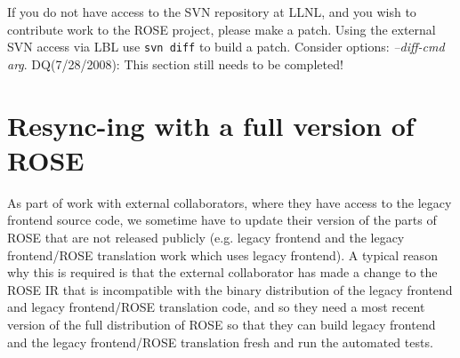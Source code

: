 \begin{enumerate}

    \end{enumerate}

  If you do not have access to the SVN repository at LLNL, and you wish to contribute
    work to the ROSE project, please make a patch.  Using the external SVN access via
    LBL use {\tt svn diff} to build a patch.
    Consider options: {\em --diff-cmd arg}.
    DQ(7/28/2008): This section still needs to be completed!




\section{Resync-ing with a full version of ROSE}%
   As part of work with external collaborators, where they have 
access to the legacy frontend source code, we sometime have to update their
version of the parts of ROSE that are not released publicly
(e.g. legacy frontend and the legacy frontend/ROSE translation work which uses legacy frontend).
A typical reason why this is required is that the external
collaborator has made a change to the ROSE IR that is incompatible
with the binary distribution of the legacy frontend and legacy frontend/ROSE translation code,
and so they need a most recent version of the full distribution of
ROSE so that they can build legacy frontend and the legacy frontend/ROSE translation fresh
and run the automated tests.

